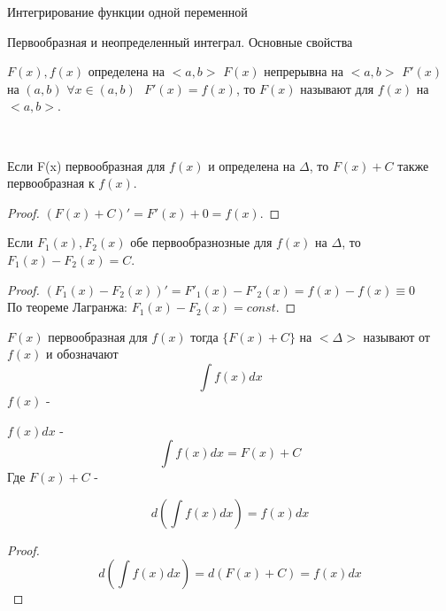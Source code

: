 \begin{title}
  Интегрирование функции одной переменной
\end{title}

\begin{title}[\Large]
  Первообразная и неопределенный интеграл. Основные свойства
\end{title}

\begin{defin}[первообразной]
  $F(x), f(x)$ определена на $<a,b>$ $F(x)$ непрерывна на $<a,b>$ $F'(x)$
  на $(a,b)$ $\forall x \in (a, b) ~~~ F'(x) = f(x)$,
  то $F(x)$ называют  для $f(x)$ на $<a,b>$.
\end{defin}

\\

Если F(x) первообразная для $f(x)$ и определена на $\Delta$, то $F(x) + C$
также первообразная к $f(x)$.

\begin{proof}
  $(F(x) + C)' = F'(x) + 0 = f(x)$.
\end{proof}


Если $F_{1}(x), F_{2}(x)$ обе первообразнозные для $f(x)$ на $\Delta$,
то $F_{1}(x) - F_{2}(x) = C$.

\begin{proof}
  $(F_{1}(x) - F_{2}(x))' = F'_{1}(x) - F'_{2}(x) = f(x) - f(x) \equiv 0$\\
  По теореме Лагранжа: $F_{1}(x) - F_{2}(x) = const$.
\end{proof}

\begin{defin}
  $F(x)$ первообразная для $f(x)$ тогда $\{ F(x) + C \}$ на $<\Delta>$ называют
   от $f(x)$ и обозначают
  \[
  \int f(x)dx
  \]
  $f(x)$ - 

  $f(x)dx$ - 
  \[
  \int f(x)dx = F(x) + C
  \]
  Где $F(x) + C$ - 
\end{defin}



\[d \left ( \int f(x)dx \right ) = f(x)dx \]

\begin{proof}
  \[
  d \left ( \int f(x)dx \right ) = d(F(x) + C) = f(x)dx
  \]
\end{proof}

